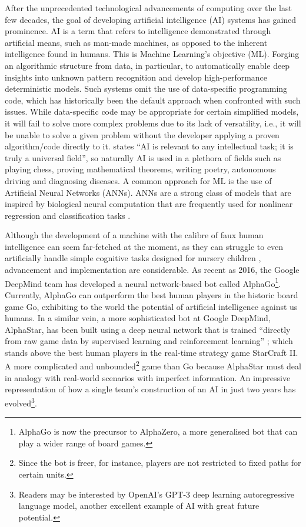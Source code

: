 After the unprecedented technological advancements of computing over the last few decades, the goal of developing artificial intelligence (AI) systems has gained prominence. 
AI is a term that refers to intelligence demonstrated through artificial means, such as man-made machines, as opposed to the inherent intelligence found in humans.
This is Machine Learning's objective (ML).
Forging an algorithmic structure from data, in particular, to automatically enable deep insights into unknown pattern recognition and develop high-performance deterministic models.
Such systems omit the use of data-specific programming code, which has historically been the default approach when confronted with such issues.
While data-specific code may be appropriate for certain simplified models, it will fail to solve more complex problems due to its lack of versatility, i.e., it will be unable to solve a given problem without the developer applying a proven algorithm/code directly to it. 
\textcite{artifical} states ``AI  is relevant  to  any intellectual task; it is truly a universal field'', so naturally AI is used in a plethora of fields such as playing chess, proving mathematical theorems, writing poetry,  autonomous driving  and  diagnosing  diseases. A common approach for ML is the use of Artificial Neural Networks (ANNs). ANNs are a strong class of models that are inspired by biological neural computation that are frequently used for nonlinear regression and classification tasks \parencite{DREISEITL2002352}.

Although the development  of a machine with the calibre of faux human intelligence can seem far-fetched at the moment, as they can struggle to even artificially handle simple cognitive tasks designed for nursery children \parencite{deepmindchild}, advancement and implementation are considerable. As recent as 2016, the Google DeepMind team has developed a neural network-based bot called AlphaGo\footnote{AlphaGo is now the precursor to AlphaZero, a more generalised bot that can play a wider range of board games.}. Currently, AlphaGo can outperform the best human players in the historic board game Go, exhibiting to the world the potential of artificial intelligence against us humans. In a similar vein, a more sophisticated bot at Google DeepMind, AlphaStar, has been built using a deep neural network that is trained ``directly from raw game data by supervised learning and reinforcement learning'' \parencite{alphastar}; which stands above the best human players in the real-time strategy game StarCraft II. A more complicated and unbounded\footnote{Since the bot is freer, for instance, players are not restricted to fixed paths for certain units.} game than Go because AlphaStar must deal in analogy with real-world scenarios with imperfect information. An impressive representation of how a single team's construction of an AI in just two years has evolved\footnote{Readers may be interested by OpenAI's GPT-3 deep learning autoregressive language model, another excellent example of AI with great future potential.}. 